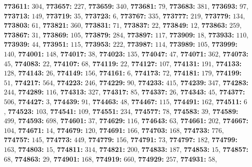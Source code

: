 \textsf{\bfseries 773611:} $304$, \textsf{\bfseries 773657:} $227$, \textsf{\bfseries 773659:} $340$, \textsf{\bfseries 773681:} $79$, \textsf{\bfseries 773683:} $381$, \textsf{\bfseries 773693:} $97$, \textsf{\bfseries 773713:} $149$, \textsf{\bfseries 773719:} $35$, \textsf{\bfseries 773723:} $6$, \textsf{\bfseries 773767:} $335$, \textsf{\bfseries 773777:} $219$, \textsf{\bfseries 773779:} $134$, \textsf{\bfseries 773803:} $61$, \textsf{\bfseries 773821:} $360$, \textsf{\bfseries 773831:} $71$, \textsf{\bfseries 773837:} $22$, \textsf{\bfseries 773849:} $12$, \textsf{\bfseries 773863:} $259$, \textsf{\bfseries 773867:} $31$, \textsf{\bfseries 773869:} $105$, \textsf{\bfseries 773879:} $284$, \textsf{\bfseries 773897:} $117$, \textsf{\bfseries 773909:} $18$, \textsf{\bfseries 773933:} $110$, \textsf{\bfseries 773939:} $44$, \textsf{\bfseries 773951:} $115$, \textsf{\bfseries 773953:} $222$, \textsf{\bfseries 773987:} $114$, \textsf{\bfseries 773989:} $105$, \textsf{\bfseries 773999:} $140$, \textsf{\bfseries 774001:} $148$, \textsf{\bfseries 774017:} $38$, \textsf{\bfseries 774023:} $135$, \textsf{\bfseries 774047:} $47$, \textsf{\bfseries 774071:} $362$, \textsf{\bfseries 774073:} $45$, \textsf{\bfseries 774083:} $22$, \textsf{\bfseries 774107:} $68$, \textsf{\bfseries 774119:} $22$, \textsf{\bfseries 774127:} $107$, \textsf{\bfseries 774131:} $191$, \textsf{\bfseries 774133:} $128$, \textsf{\bfseries 774143:} $26$, \textsf{\bfseries 774149:} $156$, \textsf{\bfseries 774161:} $6$, \textsf{\bfseries 774173:} $72$, \textsf{\bfseries 774181:} $179$, \textsf{\bfseries 774199:} $51$, \textsf{\bfseries 774217:} $564$, \textsf{\bfseries 774223:} $246$, \textsf{\bfseries 774229:} $90$, \textsf{\bfseries 774233:} $415$, \textsf{\bfseries 774239:} $347$, \textsf{\bfseries 774283:} $244$, \textsf{\bfseries 774289:} $116$, \textsf{\bfseries 774313:} $327$, \textsf{\bfseries 774317:} $85$, \textsf{\bfseries 774337:} $26$, \textsf{\bfseries 774343:} $45$, \textsf{\bfseries 774377:} $506$, \textsf{\bfseries 774427:} $3$, \textsf{\bfseries 774439:} $91$, \textsf{\bfseries 774463:} $48$, \textsf{\bfseries 774467:} $115$, \textsf{\bfseries 774491:} $162$, \textsf{\bfseries 774511:} $6$, \textsf{\bfseries 774523:} $103$, \textsf{\bfseries 774541:} $109$, \textsf{\bfseries 774551:} $234$, \textsf{\bfseries 774577:} $78$, \textsf{\bfseries 774583:} $39$, \textsf{\bfseries 774589:} $499$, \textsf{\bfseries 774593:} $698$, \textsf{\bfseries 774601:} $37$, \textsf{\bfseries 774629:} $116$, \textsf{\bfseries 774643:} $63$, \textsf{\bfseries 774661:} $202$, \textsf{\bfseries 774667:} $104$, \textsf{\bfseries 774671:} $14$, \textsf{\bfseries 774679:} $120$, \textsf{\bfseries 774691:} $166$, \textsf{\bfseries 774703:} $168$, \textsf{\bfseries 774733:} $776$, \textsf{\bfseries 774757:} $145$, \textsf{\bfseries 774773:} $449$, \textsf{\bfseries 774779:} $156$, \textsf{\bfseries 774791:} $73$, \textsf{\bfseries 774797:} $182$, \textsf{\bfseries 774799:} $163$, \textsf{\bfseries 774803:} $15$, \textsf{\bfseries 774811:} $314$, \textsf{\bfseries 774821:} $200$, \textsf{\bfseries 774833:} $187$, \textsf{\bfseries 774853:} $15$, \textsf{\bfseries 774857:} $68$, \textsf{\bfseries 774863:} $29$, \textsf{\bfseries 774901:} $168$, \textsf{\bfseries 774919:} $660$, \textsf{\bfseries 774929:} $257$, \textsf{\bfseries 774931:} $58$, 
